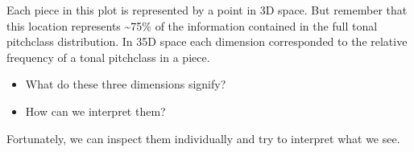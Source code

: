 \documentclass[letterpaper,10pt,english]{sphinxmanual}
\begin{document}
Each piece in this plot is represented by a point in 3\sphinxhyphen{}D space. But remember that this location represents \textasciitilde{}75\% of the information contained in the full tonal pitch\sphinxhyphen{}class distribution. In 35\sphinxhyphen{}D space each dimension corresponded to the relative frequency of a tonal pitch\sphinxhyphen{}class in a piece.
\begin{itemize}
\item {} 
What do these three dimensions signify?

\item {} 
How can we interpret them?

\end{itemize}

Fortunately, we can inspect them individually and try to interpret what we see.
\end{document}
